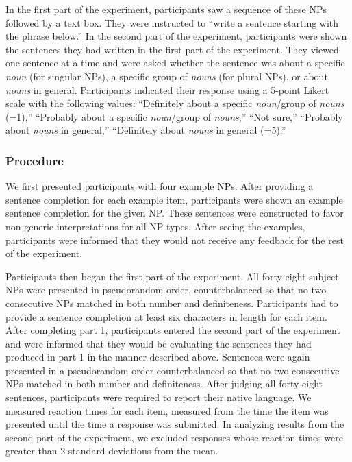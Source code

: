 \documentclass[10pt,letterpaper]{article}
\begin{document}
In the first part of the experiment, participants saw a sequence of these NPs followed by a text box. They were instructed to ``write a sentence starting with the phrase below.'' In the second part of the experiment, participants were shown the sentences they had written in the first part of the experiment. They viewed one sentence at a time and were asked whether the sentence was about a specific \textit{noun} (for singular NPs), a specific group of \textit{nouns} (for plural NPs), or about \textit{nouns} in general. Participants indicated their response using a 5-point Likert scale with the following values: ``Definitely about a specific \textit{noun}/group of \textit{nouns} (=1),'' ``Probably about a specific \textit{noun}/group of \textit{nouns},'' ``Not sure,'' ``Probably about \textit{nouns} in general,'' ``Definitely about \textit{nouns} in general (=5).''

\subsubsection{Procedure}

We first presented participants with four example NPs. After providing a sentence completion for each example item, participants were shown an example sentence completion for the given NP. These sentences were constructed to favor non-generic interpretations for all NP types. After seeing the examples, participants were informed that they would not receive any feedback for the rest of the experiment.

Participants then began the first part of the experiment. All forty-eight subject NPs were presented in pseudorandom order, counterbalanced so that no two consecutive NPs matched in both number and definiteness. Participants had to provide a sentence completion at least six characters in length for each item. After completing part 1, participants entered the second part of the experiment and were informed that they would be evaluating the sentences they had produced in part 1 in the manner described above. Sentences were again presented in a pseudorandom order counterbalanced so that no two consecutive NPs matched in both number and definiteness. After judging all forty-eight sentences, participants were required to report their native language. We measured reaction times for each item, measured from the time the item was presented until the time a response was submitted. In analyzing results from the second part of the experiment, we excluded responses whose reaction times were greater than 2 standard deviations from the mean.
\end{document}
